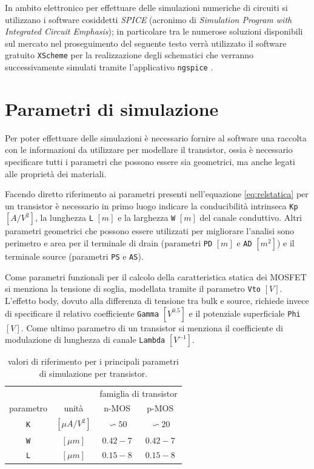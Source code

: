 	\vspace{3mm}
	
	In ambito elettronico per effettuare delle simulazioni numeriche di circuiti si utilizzano i software cosiddetti \textit{SPICE} (acronimo di \textit{Simulation Program with Integrated Circuit Emphasis}); in particolare tra le numerose soluzioni disponibili sul mercato nel proseguimento del seguente testo verrà utilizzato il software gratuito \texttt{XScheme} \cite{xschem} per la realizzazione degli schematici che verranno successivamente simulati tramite l'applicativo \texttt{ngspice} \cite{ngspice}.
	
\section{Parametri di simulazione}
	Per poter effettuare delle simulazioni è necessario fornire al software una raccolta con le informazioni da utilizzare per modellare il transistor, ossia è necessario specificare tutti i parametri che possono essere sia geometrici, ma anche legati alle proprietà dei materiali. 
	
	Facendo diretto riferimento ai parametri presenti nell'equazione \ref{eq:relstatica} per un transistor è necessario in primo luogo indicare la conducibilità intrinseca \texttt{Kp} $[A/V^2]$, la lunghezza \texttt{L} $[m]$  e la larghezza \texttt{W} $[m]$  del canale conduttivo. Altri parametri geometrici che possono essere utilizzati per migliorare l'analisi sono perimetro e area per il terminale di drain (parametri \texttt{PD} $[m]$ e \texttt{AD} $[m^2]$) e il terminale source (parametri \texttt{PS} e \texttt{AS}).
	
	Come parametri funzionali per il calcolo della caratteristica statica dei MOSFET si menziona la tensione di soglia, modellata tramite il parametro \texttt{Vto} $[V]$. L'effetto body, dovuto alla differenza di tensione tra bulk e source, richiede invece di specificare il relativo coefficiente \texttt{Gamma} $\left[V^{0.5}\right]$ e il potenziale superficiale \texttt{Phi} $[V]$. Come ultimo parametro di un transistor si menziona il coefficiente di modulazione di lunghezza di canale \texttt{Lambda} $\left[V^{-1}\right]$.
	
	\begin{table}[bht]
		
		\centering
		\begin{tabular}{ c c | c   c}
			& & \multicolumn{2}{c}{famiglia di transistor }  \\
			parametro & unità & n-MOS & p-MOS \\ \hline 
			\texttt{K} & $[\mu A/V^2]$ & $\backsim 50$ & $\backsim 20$ \\
			\texttt{W} & $[\mu m]$ & $0.42-7$ & $0.42-7$ \\
			\texttt{L} & $[\mu m]$ & $0.15-8$ & $0.15-8$ \\
		\end{tabular}
		\caption{valori di riferimento per i principali parametri di simulazione per transistor.}
		
		
	\end{table}


